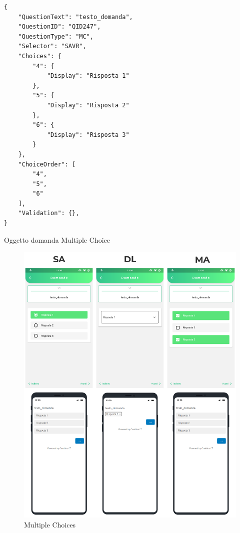 \begin{json}
\begin{verbatim}
{
    "QuestionText": "testo_domanda",
    "QuestionID": "QID247",
    "QuestionType": "MC",
    "Selector": "SAVR",
    "Choices": {
        "4": {
            "Display": "Risposta 1"
        },
        "5": {
            "Display": "Risposta 2"
        },
        "6": {
            "Display": "Risposta 3"
        }
    },
    "ChoiceOrder": [
        "4",
        "5",
        "6"
    ],
    "Validation": {},
}
\end{verbatim}
\caption{Oggetto domanda Multiple Choice}
\label{json:mc}
\end{json}

\begin{figure}[ht!]
\centering
\includegraphics[width=\textwidth]{img/mc_flutter}
\caption{Multiple Choices}
\label{fig:mc}
\end{figure}

